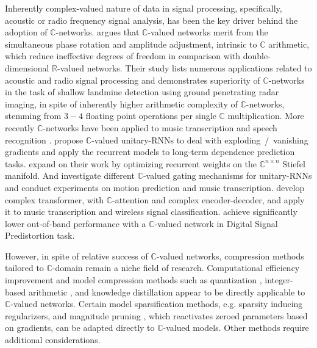 \documentclass[a4paper,10pt,onecolumn]{article}
\newcommand{\real}{\mathbb{R}}
\newcommand{\cplx}{\mathbb{C}}
\begin{document}
Inherently complex-valued nature of data in signal processing, specifically, acoustic or radio
frequency signal analysis, has been the key driver behind the adoption of $\cplx$-networks.
%
\citet{hirose_complex-valued_2009} argues that $\cplx$-valued networks merit from the
simultaneous phase rotation and amplitude adjustment, intrinsic to $\cplx$ arithmetic,
which reduce ineffective degrees of freedom in comparison with double-dimensional
$\real$-valued networks. Their study lists numerous applications related to acoustic
and radio signal processing and demonstrates superiority of $\cplx$-networks in the
task of shallow landmine detection using ground penetrating radar imaging, in spite of
inherently higher arithmetic complexity of $\cplx$-networks, stemming from $3-4$ floating
point operations per single $\cplx$ multiplication. More recently $\cplx$-networks have
been applied to music transcription and speech recognition \citep{trabelsi_deep_2017}.
\citet{arjovsky_unitary_2016} propose $\cplx$-valued unitary-RNNs to deal with exploding~/~vanishing
gradients and apply the recurrent models to long-term dependence prediction tasks.
\citet{wisdom_full-capacity_2016} expand on their work by optimizing recurrent weights on
the $\cplx^{n \times n}$ Stiefel manifold. And \citet{wolter_complex_2018} investigate
different $\cplx$-valued gating mechanisms for unitary-RNNs and conduct experiments on
motion prediction and music transcription. \citet{yang_complex_2019} develop complex
transformer, with $\cplx$-attention and complex encoder-decoder, and apply it to music
transcription and wireless signal classification. \citet{tarver_design_2019} achieve
significantly lower out-of-band performance with a $\cplx$-valued network in Digital Signal
Predistortion task.


However, in spite of relative success of $\cplx$-valued networks, compression methods tailored
to $\cplx$-domain remain a niche field of research.
%
Computational efficiency improvement and model compression methods such as quantization
\citep{uhlich_differentiable_2019}, integer-based arithmetic \citep{lin_fixed_2016,chen_fxpnet_2017},
and knowledge distillation \citep{hinton_distilling_2015} appear to be directly applicable
to $\cplx$-valued networks.
%
Certain model sparsification methods, e.g. sparsity inducing regularizers, and magnitude
pruning \citep{zhu_prune_2018}, which reactivates zeroed parameters based on gradients,
can be adapted directly to $\cplx$-valued models. Other methods require additional considerations.
\end{document}
